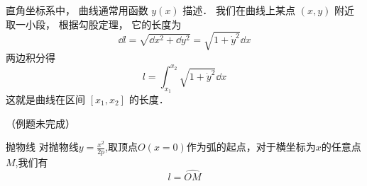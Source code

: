 

直角坐标系中， 曲线通常用函数 $y(x)$ 描述． 我们在曲线上某点 $(x, y)$ 附近取一小段， 根据勾股定理， 它的长度为
\begin{equation}
\dd{l} = \sqrt{\dd{x}^2 + \dd{y}^2} = \sqrt{1 + \dot y^2} \dd{x}
\end{equation}
两边积分得
\begin{equation}\label{CurLen_eq1}
l = \int_{x_1}^{x_2} \sqrt{1 + \dot y^2} \dd{x}
\end{equation}
这就是曲线在区间 $[x_1, x_2]$ 的长度．

（例题未完成）
\begin{example}{抛物线}
对抛物线$y=\frac{x^2}{2p}$,取顶点$O(x=0)$作为弧的起点，对于横坐标为$x$的任意点$M$,我们有
\begin{equation}
l=\hat{OM}
\end{equation}

\end{example}